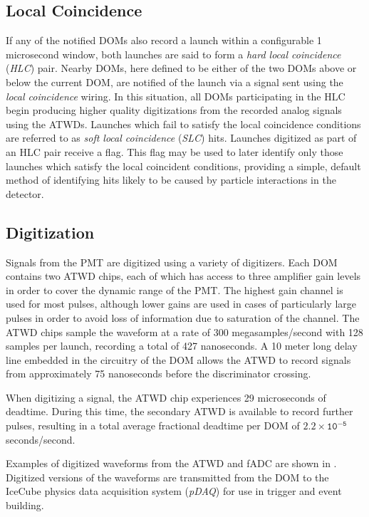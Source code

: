 \label{subsec:LC}
\subsection{Local Coincidence}
If any of the notified DOMs also record a launch within a configurable 1 microsecond window, both launches are said to form a \emph{hard local coincidence} (\emph{HLC}) pair.
Nearby DOMs, here defined to be either of the two DOMs above or below the current DOM, are notified of the launch via a signal sent using the \emph{local coincidence} wiring.
In this situation, all DOMs participating in the HLC begin producing higher quality digitizations from the recorded analog signals using the ATWDs.
Launches which fail to satisfy the local coincidence conditions are referred to as \emph{soft local coincidence} (\emph{SLC}) hits.
Launches digitized as part of an HLC pair receive a flag. 
This flag may be used to later identify only those launches which satisfy the local coincident conditions, providing a simple, default method of identifying hits likely to be caused by particle interactions in the detector.

\label{subsec:digitization}
\subsection{Digitization}
Signals from the PMT are digitized using a variety of digitizers.
Each DOM contains two ATWD chips, each of which has access to three amplifier gain levels in order to cover the dynamic range of the PMT.
The highest gain channel is used for most pulses, although lower gains are used in cases of particularly large pulses in order to avoid loss of information due to saturation of the channel.
The ATWD chips sample the waveform at a rate of 300 megasamples/second with 128 samples per launch, recording a total of 427 nanoseconds.
A 10 meter long delay line embedded in the circuitry of the DOM allows the ATWD to record signals from approximately 75 nanoseconds before the discriminator crossing.

When digitizing a signal, the ATWD chip experiences 29 microseconds of deadtime. 
During this time, the secondary ATWD is available to record further pulses, resulting in a total average fractional deadtime per DOM of $\mathtt{2.2 \times 10^{-5}}$ seconds/second.

Examples of digitized waveforms from the ATWD and fADC are shown in .
Digitized versions of the waveforms are transmitted from the DOM to the IceCube physics data acquisition system (\emph{pDAQ}) for use in trigger and event building.
